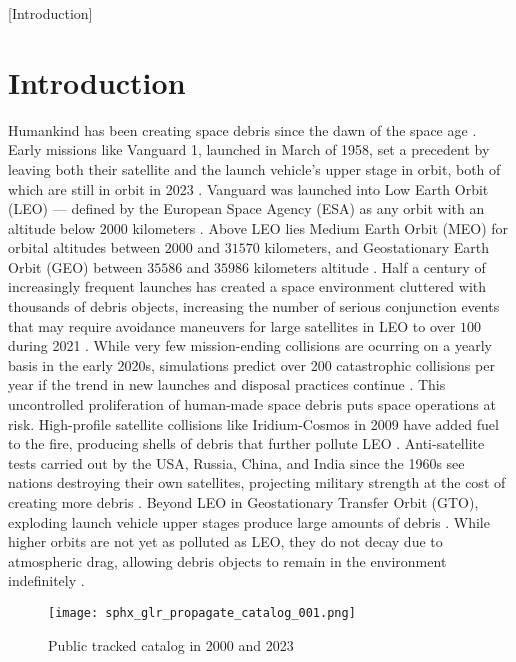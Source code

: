 [Introduction]
\graphicspath{{/Users/liamrobinson/Documents/PyLightCurves/docs/build/html/_images}}

\chapter{Introduction}

Humankind has been creating space debris since the dawn of the space age \cite{esareport2022}. Early missions like Vanguard 1, launched in March of 1958, set a precedent by leaving both their satellite and the launch vehicle's upper stage in orbit, both of which are still in orbit in 2023 \cite{vanguard1}. Vanguard was launched into Low Earth Orbit (LEO) --- defined by the European Space Agency (ESA) as any orbit with an altitude below $2000$ kilometers \cite{esareport2022}. Above LEO lies Medium Earth Orbit (MEO) for orbital altitudes between $2000$ and $31570$ kilometers, and Geostationary Earth Orbit (GEO) between $35586$ and $35986$ kilometers altitude \cite{esareport2022}. Half a century of increasingly frequent launches has created a space environment cluttered with thousands of debris objects, increasing the number of serious conjunction events that may require avoidance maneuvers for large satellites in LEO to over $100$ during 2021 \cite{esareport2022}. While very few mission-ending collisions are ocurring on a yearly basis in the early 2020s, simulations predict over 200 catastrophic collisions per year if the trend in new launches and disposal practices continue \cite{esareport2022}. This uncontrolled proliferation of human-made space debris puts space operations at risk. High-profile satellite collisions like Iridium-Cosmos in 2009 have added fuel to the fire, producing shells of debris that further pollute LEO \cite{vallado4ed}. Anti-satellite tests carried out by the USA, Russia, China, and India since the 1960s see nations destroying their own satellites, projecting military strength at the cost of creating more debris \cite{vallado4ed}. Beyond LEO in Geostationary Transfer Orbit (GTO), exploding launch vehicle upper stages produce large amounts of debris \cite{esareport2022}. While higher orbits are not yet as polluted as LEO, they do not decay due to atmospheric drag, allowing debris objects to remain in the environment indefinitely \cite{vallado4ed}.

\begin{figure}[ht]
    \centering
    \texttt{[image: sphx\_glr\_propagate\_catalog\_001.png]}
    \caption{Public tracked catalog in 2000 and 2023}
    \label{fig:catalog_comparison}
\end{figure}

